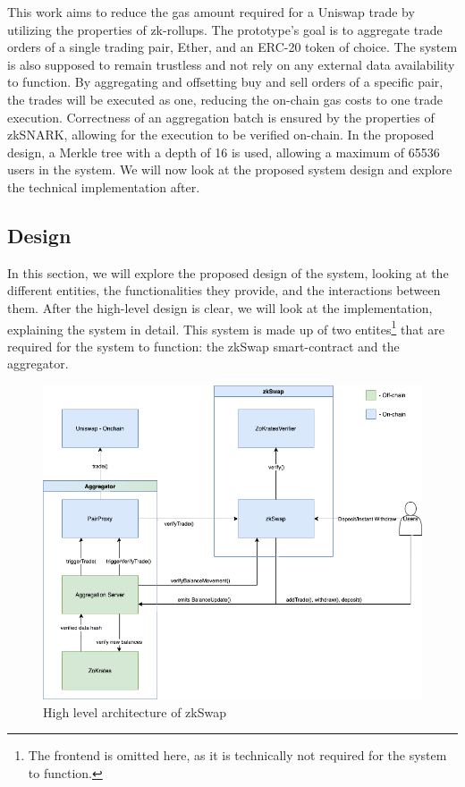 \documentclass[../../thesis.tex]{subfiles}
\begin{document}
This work aims to reduce the gas amount required for a Uniswap trade by utilizing the properties of zk-rollups. The prototype's goal is to aggregate trade orders of a single trading pair, Ether, and an ERC-20 token of choice. The system is also supposed to remain trustless and not rely on any external data availability to function. By aggregating and offsetting buy and sell orders of a specific pair, the trades will be executed as one, reducing the on-chain gas costs to one trade execution. Correctness of an aggregation batch is ensured by the properties of zkSNARK, allowing for the execution to be verified on-chain. In the proposed design, a Merkle tree with a depth of 16 is used, allowing a maximum of 65536 users in the system. We will now look at the proposed system design and explore the technical implementation after. 

\subsection{Design}
In this section, we will explore the proposed design of the system, looking at the different entities, the functionalities they provide, and the interactions between them. After the high-level design is clear, we will look at the implementation, explaining the system in detail. This system is made up of two entites\footnote{The frontend is omitted here, as it is technically not required for the system to function.} that are required for the system to function: the zkSwap smart-contract and the aggregator.

\begin{figure}[h]
    \centerline{\includegraphics[totalheight=10cm]{diagrams/architecture.png}}
    \caption{High level architecture of zkSwap}
    \label{fig:architecture}
\end{figure}
\end{document}
